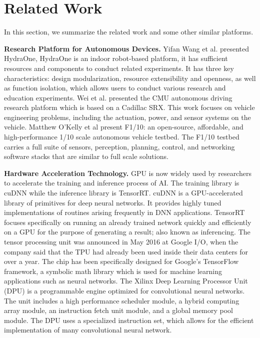 \documentclass[conference]{IEEEtran}
\begin{document}
\section{Related Work}

In this section, we summarize the related work and some other similar platforms.

\textbf{Research Platform for Autonomous Devices.} Yifan Wang et al. presented HydraOne\cite{b9}, HydraOne is an indoor robot-based platform, it has sufficient resources and components to conduct related experiments. It has three key characteristics: design modularization, resource extensibility and openness, as well as function isolation, which allows users to conduct various research and education experiments. Wei et al. presented the CMU autonomous driving research platform which is based on a Cadillac SRX\cite{b10}. This work focuses on vehicle engineering problems, including the actuation, power, and sensor systems on the vehicle. Matthew O’Kelly et al present F1/10\cite{b11}: an open-source, affordable, and high-performance 1/10 scale autonomous vehicle testbed. The F1/10 testbed carries a full suite of sensors, perception, planning, control, and networking software stacks that are similar to full scale solutions. 

\textbf{Hardware Acceleration Technology.} GPU\cite{b12} is now widely used by researchers to accelerate the training and inference process of AI. The training library is cuDNN\cite{b13} while the inference library is TensorRT\cite{b14}. cuDNN is a GPU-accelerated library of primitives for deep neural networks. It provides highly tuned implementations of routines arising frequently in DNN applications. TensorRT focuses specifically on running an already trained network quickly and efficiently on a GPU for the purpose of generating a result; also known as inferencing. The tensor processing unit was announced in May 2016 at Google I/O, when the company said that the TPU had already been used inside their data centers for over a year\cite{b15}. The chip has been specifically designed for Google's TensorFlow framework, a symbolic math library which is used for machine learning applications such as neural networks.\cite{b16} The Xilinx Deep Learning Processor Unit (DPU)\cite{b17} is a programmable engine optimized for convolutional neural networks. The unit includes a high performance scheduler module, a hybrid computing array module, an instruction fetch unit module, and a global memory pool module. The DPU uses a specialized instruction set, which allows for the efficient implementation of many convolutional neural network.
\end{document}
